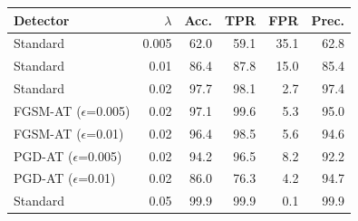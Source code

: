 \begin{tabular}{lrrrrr}
\toprule
Detector & $\lambda$ & Acc. & TPR & FPR & Prec. \\
\midrule
Standard & 0.005 & 62.0 & 59.1 & 35.1 & 62.8 \\
Standard & 0.01 & 86.4 & 87.8 & 15.0 & 85.4 \\
Standard & 0.02 & 97.7 & 98.1 & 2.7 & 97.4 \\
FGSM-AT ($\epsilon$=0.005) & 0.02 & 97.1 & 99.6 & 5.3 & 95.0 \\
FGSM-AT ($\epsilon$=0.01) & 0.02 & 96.4 & 98.5 & 5.6 & 94.6 \\
PGD-AT ($\epsilon$=0.005) & 0.02 & 94.2 & 96.5 & 8.2 & 92.2 \\
PGD-AT ($\epsilon$=0.01) & 0.02 & 86.0 & 76.3 & 4.2 & 94.7 \\
Standard & 0.05 & 99.9 & 99.9 & 0.1 & 99.9 \\
\bottomrule
\end{tabular}
